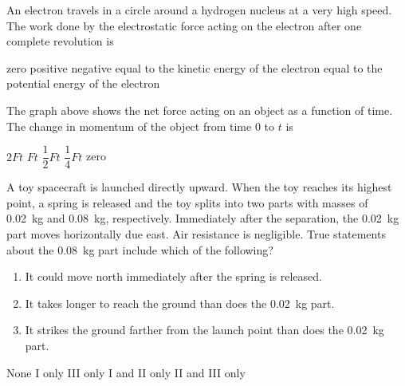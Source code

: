 \documentclass[12pt]{../../oss-apphys-exam}
\begin{document}
\begin{questions}
  \question An electron travels in a circle around a hydrogen nucleus at a very
  high  speed. The work done by the electrostatic force acting on the electron
  after one complete revolution is
  \begin{choices}
    \choice zero
    \choice positive
    \choice negative
    \choice equal to the kinetic energy of the electron
    \choice equal to the potential energy of the electron
  \end{choices}
  \newpage
  
  \question\vspace{-.1in}The graph above shows the net force acting on an
  object as a function of time. The change in momentum of the object from time
  0 to $t$ is
  \begin{choices}
    \choice $2Ft$
    \choice $Ft$
    \choice $\dfrac12Ft$
    \choice $\dfrac14Ft$
    \choice zero
  \end{choices}
  \newpage
  
  \question A toy spacecraft is launched directly upward. When the toy reaches
  its highest point, a spring is released and the toy splits into two parts
  with masses of \SI{.02}{\kilo\gram} and \SI{.08}{\kilo\gram}, respectively.
  Immediately after the separation, the \SI{.02}{\kilo\gram} part moves
  horizontally due east. Air resistance is negligible. True statements about
  the \SI{.08}{\kilo\gram} part include which of the following?
  \begin{enumerate}[nosep]
  \item[I.] It could move north immediately after the spring is released.
  \item[II.] It takes longer to reach the ground than does the
    \SI{.02}{\kilo\gram} part.
  \item[III.] It strikes the ground farther from the launch point than does the
    \SI{.02}{\kilo\gram} part.
  \end{enumerate}
  \begin{choices}
    \choice None
    \choice I only
    \choice III only
    \choice I and II only
    \choice II and III only
  \end{choices}
  \newpage
  

\end{questions}
\end{document}
